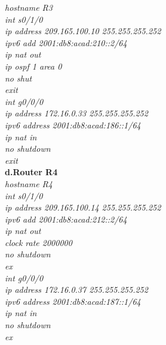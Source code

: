 \documentclass[a4paper, 12pt]{article}
\begin{document}
\hspace*{2cm}\textit{hostname R3\\
\hspace*{2cm}int s0/1/0\\
\hspace*{2cm} ip address 209.165.100.10 255.255.255.252\\
\hspace*{2cm}ipv6 add 2001:db8:acad:210::2/64\\
\hspace*{2cm}ip nat out\\
\hspace*{2cm}ip ospf 1 area 0\\
\hspace*{2cm}no shut\\
\hspace*{2cm}exit\\
\hspace*{2cm}int g0/0/0\\
\hspace*{2cm}ip address 172.16.0.33 255.255.255.252\\
\hspace*{2cm}ipv6 address 2001:db8:acad:186::1/64\\
\hspace*{2cm}ip nat in\\
\hspace*{2cm}no shutdown\\
\hspace*{2cm}exit\\}
\hspace*{1cm}\textbf{d.Router R4} \\
\hspace*{2cm}\textit{hostname R4\\
\hspace*{2cm}int s0/1/0\\
\hspace*{2cm} ip address 209.165.100.14 255.255.255.252\\
\hspace*{2cm}ipv6 add 2001:db8:acad:212::2/64\\
\hspace*{2cm}ip nat out\\
\hspace*{2cm}clock rate 2000000\\
\hspace*{2cm}no shutdown\\
\hspace*{2cm}ex\\
\hspace*{2cm}int g0/0/0\\
\hspace*{2cm}ip address 172.16.0.37 255.255.255.252\\
\hspace*{2cm}ipv6 address 2001:db8:acad:187::1/64\\
\hspace*{2cm}ip nat in\\
\hspace*{2cm}no shutdown\\
\hspace*{2cm}ex\\}
\end{document}
